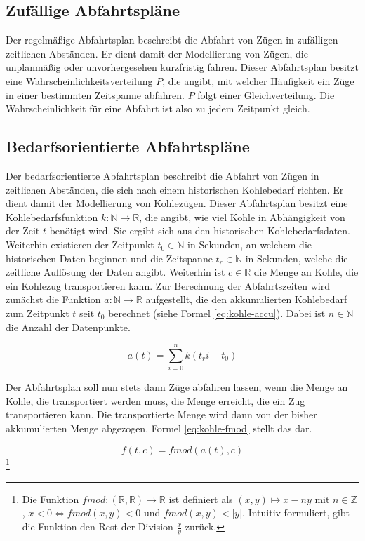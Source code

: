 \subsection{Zufällige Abfahrtspläne}

Der regelmäßige Abfahrtsplan beschreibt die Abfahrt von Zügen in zufälligen zeitlichen Abständen. Er dient damit der Modellierung von Zügen, die unplanmäßig oder unvorhergesehen kurzfristig fahren. Dieser Abfahrtsplan besitzt eine Wahrscheinlichkeitsverteilung $P$, die angibt, mit welcher Häufigkeit ein Züge in einer bestimmten Zeitspanne abfahren. $P$ folgt einer Gleichverteilung. Die Wahrscheinlichkeit für eine Abfahrt ist also zu jedem Zeitpunkt gleich.

\subsection{Bedarfsorientierte Abfahrtspläne}

Der bedarfsorientierte Abfahrtsplan beschreibt die Abfahrt von Zügen in zeitlichen Abständen, die sich nach einem historischen Kohlebedarf richten. Er dient damit der Modellierung von Kohlezügen. Dieser Abfahrtsplan besitzt eine Kohlebedarfsfunktion $k:\mathbb{N}\to\mathbb{R}$, die angibt, wie viel Kohle in Abhängigkeit von der Zeit $t$ benötigt wird. Sie ergibt sich aus den historischen Kohlebedarfsdaten. Weiterhin existieren der Zeitpunkt $t_0 \in \mathbb{N}$ in Sekunden, an welchem die historischen Daten beginnen und die Zeitspanne $t_r \in \mathbb{N}$ in Sekunden, welche die zeitliche Auflösung der Daten angibt. Weiterhin ist $c\in\mathbb{R}$ die Menge an Kohle, die ein Kohlezug transportieren kann. Zur Berechnung der Abfahrtszeiten wird zunächst die Funktion $a: \mathbb{N} \to \mathbb{R}$ aufgestellt, die den akkumulierten Kohlebedarf zum Zeitpunkt $t$ seit $t_0$ berechnet (siehe Formel \ref{eq:kohle-accu}). Dabei ist $n\in\mathbb{N}$ die Anzahl der Datenpunkte.

\begin{equation}
    a(t)=\sum_{i=0}^n  k(t_ri+t_0)\label{eq:kohle-accu}
\end{equation}

Der Abfahrtsplan soll nun stets dann Züge abfahren lassen, wenn die Menge an Kohle, die transportiert werden muss, die Menge erreicht, die ein Zug transportieren kann. Die transportierte Menge wird dann von der bisher akkumulierten Menge abgezogen. Formel \ref{eq:kohle-fmod} stellt das dar.

\begin{equation}
    f(t, c)=fmod(a(t), c)\label{eq:kohle-fmod}
\end{equation}\footnote{Die Funktion $fmod:(\mathbb{R},\mathbb{R}) \to \mathbb{R}$ ist definiert als $(x,y)\mapsto x-ny$ mit $n\in\mathbb{Z}$, $x<0\Leftrightarrow fmod(x,y)<0$ und $fmod(x,y)<|y|$. Intuitiv formuliert, gibt die Funktion den Rest der Division $\frac{x}{y}$ zurück.}

